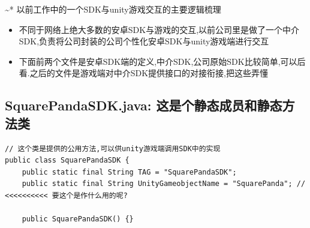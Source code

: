\documentclass[9pt, b5paper]{article}
\begin{document}
\textasciitilde{}* 以前工作中的一个SDK与unity游戏交互的主要逻辑梳理
\begin{itemize}
\item 不同于网络上绝大多数的安卓SDK与游戏的交互,以前公司里是做了一个中介SDK,负责将公司封装的公司个性化安卓SDK与unity游戏端进行交互
\item 下面前两个文件是安卓SDK端的定义,中介SDK,公司原始SDK比较简单,可以后看.之后的文件是游戏端对中介SDK提供接口的对接衔接,把这些弄懂
\end{itemize}
\subsection{SquarePandaSDK.java: 这是个静态成员和静态方法类}
\label{sec-1-3}
\begin{verbatim}
// 这个类是提供的公用方法,可以供unity游戏端调用SDK中的实现
public class SquarePandaSDK {
    public static final String TAG = "SquarePandaSDK"; 
    public static final String UnityGameobjectName = "SquarePanda"; // <<<<<<<<<< 要这个是作什么用的呢?

    public SquarePandaSDK() {}


\end{verbatim}
\end{document}

